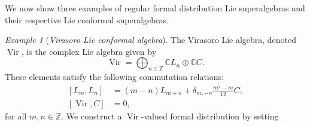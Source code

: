 \documentclass[a4paper, 12pt, reqno]{amsart}
\theoremstyle{remark}
\newtheorem{example}[theorem]{Example}
\numberwithin{equation}{subsection}
\DeclareMathOperator{\Vir}{Vir}
\begin{document}
We now show three examples of regular formal distribution Lie superalgebras and their respective Lie conformal superalgebras.

\begin{example}[\emph{Virasoro Lie conformal algebra}]
  \label{exa:1}
  The Virasoro Lie algebra, denoted $\Vir$, is the complex Lie algebra given by
  \begin{equation*}
    \Vir = \bigoplus_{n \in \mathbb{Z}}\mathbb{C}L_{n} \oplus \mathbb{C}C.
  \end{equation*}
  These elements satisfy the following commutation relations:
  \begin{equation}
    \label{eq:7}
    \begin{aligned}
      [L_m, L_n] &= (m - n)L_{m + n} + \delta_{m, -n}\frac{m^3 - m}{12}C, \\
      [\Vir, C] &= 0,
    \end{aligned}
  \end{equation}
  for all $m, n \in \mathbb{Z}$.
  We construct a $\Vir$-valued formal distribution by setting
  

\end{example}
\end{document}
